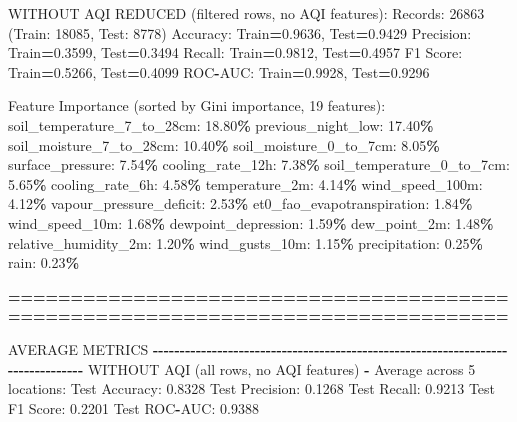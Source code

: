 \documentclass[
  letterpaper,
  DIV=11,
  numbers=noendperiod]{scrartcl}
\newenvironment{Shaded}{\begin{snugshade}}{\end{snugshade}}
\newcommand{\BuiltInTok}[1]{#1}
\newcommand{\DecValTok}[1]{\textcolor[rgb]{0.00,0.00,0.81}{#1}}
\newcommand{\FloatTok}[1]{\textcolor[rgb]{0.00,0.00,0.81}{#1}}
\newcommand{\NormalTok}[1]{#1}
\newcommand{\OperatorTok}[1]{\textcolor[rgb]{0.81,0.36,0.00}{\textbf{#1}}}
\begin{document}
\begin{Shaded}
\begin{Highlighting}[]
\NormalTok{WITHOUT AQI REDUCED (filtered rows, no AQI features):}
\NormalTok{  Records: }\DecValTok{26863}\NormalTok{ (Train: }\DecValTok{18085}\NormalTok{, Test: }\DecValTok{8778}\NormalTok{)}
\NormalTok{  Accuracy: Train}\OperatorTok{=}\FloatTok{0.9636}\NormalTok{, Test}\OperatorTok{=}\FloatTok{0.9429}
\NormalTok{  Precision: Train}\OperatorTok{=}\FloatTok{0.3599}\NormalTok{, Test}\OperatorTok{=}\FloatTok{0.3494}
\NormalTok{  Recall: Train}\OperatorTok{=}\FloatTok{0.9812}\NormalTok{, Test}\OperatorTok{=}\FloatTok{0.4957}
\NormalTok{  F1 Score: Train}\OperatorTok{=}\FloatTok{0.5266}\NormalTok{, Test}\OperatorTok{=}\FloatTok{0.4099}
\NormalTok{  ROC}\OperatorTok{{-}}\NormalTok{AUC: Train}\OperatorTok{=}\FloatTok{0.9928}\NormalTok{, Test}\OperatorTok{=}\FloatTok{0.9296}

\NormalTok{  Feature Importance (}\BuiltInTok{sorted}\NormalTok{ by Gini importance, }\DecValTok{19}\NormalTok{ features):}
\NormalTok{    soil\_temperature\_7\_to\_28cm: }\FloatTok{18.80}\OperatorTok{\%}
\NormalTok{    previous\_night\_low: }\FloatTok{17.40}\OperatorTok{\%}
\NormalTok{    soil\_moisture\_7\_to\_28cm: }\FloatTok{10.40}\OperatorTok{\%}
\NormalTok{    soil\_moisture\_0\_to\_7cm: }\FloatTok{8.05}\OperatorTok{\%}
\NormalTok{    surface\_pressure: }\FloatTok{7.54}\OperatorTok{\%}
\NormalTok{    cooling\_rate\_12h: }\FloatTok{7.38}\OperatorTok{\%}
\NormalTok{    soil\_temperature\_0\_to\_7cm: }\FloatTok{5.65}\OperatorTok{\%}
\NormalTok{    cooling\_rate\_6h: }\FloatTok{4.58}\OperatorTok{\%}
\NormalTok{    temperature\_2m: }\FloatTok{4.14}\OperatorTok{\%}
\NormalTok{    wind\_speed\_100m: }\FloatTok{4.12}\OperatorTok{\%}
\NormalTok{    vapour\_pressure\_deficit: }\FloatTok{2.53}\OperatorTok{\%}
\NormalTok{    et0\_fao\_evapotranspiration: }\FloatTok{1.84}\OperatorTok{\%}
\NormalTok{    wind\_speed\_10m: }\FloatTok{1.68}\OperatorTok{\%}
\NormalTok{    dewpoint\_depression: }\FloatTok{1.59}\OperatorTok{\%}
\NormalTok{    dew\_point\_2m: }\FloatTok{1.48}\OperatorTok{\%}
\NormalTok{    relative\_humidity\_2m: }\FloatTok{1.20}\OperatorTok{\%}
\NormalTok{    wind\_gusts\_10m: }\FloatTok{1.15}\OperatorTok{\%}
\NormalTok{    precipitation: }\FloatTok{0.25}\OperatorTok{\%}
\NormalTok{    rain: }\FloatTok{0.23}\OperatorTok{\%}

\OperatorTok{================================================================================}

\NormalTok{AVERAGE METRICS}
\OperatorTok{{-}{-}{-}{-}{-}{-}{-}{-}{-}{-}{-}{-}{-}{-}{-}{-}{-}{-}{-}{-}{-}{-}{-}{-}{-}{-}{-}{-}{-}{-}{-}{-}{-}{-}{-}{-}{-}{-}{-}{-}{-}{-}{-}{-}{-}{-}{-}{-}{-}{-}{-}{-}{-}{-}{-}{-}{-}{-}{-}{-}{-}{-}{-}{-}{-}{-}{-}{-}{-}{-}{-}{-}{-}{-}{-}{-}{-}{-}{-}{-}}
\NormalTok{WITHOUT AQI (}\BuiltInTok{all}\NormalTok{ rows, no AQI features) }\OperatorTok{{-}}\NormalTok{ Average across }\DecValTok{5}\NormalTok{ locations:}
\NormalTok{  Test Accuracy: }\FloatTok{0.8328}
\NormalTok{  Test Precision: }\FloatTok{0.1268}
\NormalTok{  Test Recall: }\FloatTok{0.9213}
\NormalTok{  Test F1 Score: }\FloatTok{0.2201}
\NormalTok{  Test ROC}\OperatorTok{{-}}\NormalTok{AUC: }\FloatTok{0.9388}


\end{Highlighting}
\end{Shaded}
\end{document}
